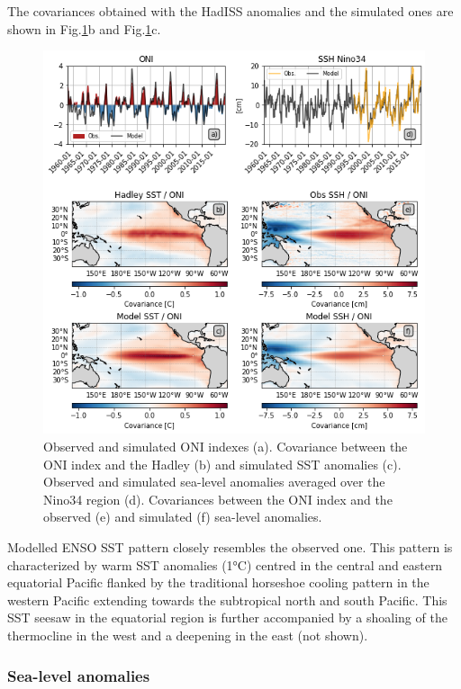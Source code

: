 The covariances obtained with the HadISS anomalies and the simulated ones are shown in Fig.\ref{fig:nemo-had-sst}b and Fig.\ref{fig:nemo-had-sst}c.

\begin{figure}
	\centering
	\includegraphics[scale=0.6]{figs/fig1.png}
	\caption{Observed and simulated ONI indexes (a). Covariance between the ONI index and the Hadley (b) and simulated SST anomalies (c). Observed and simulated sea-level anomalies averaged over the Nino34 region (d). Covariances between the ONI index and the observed (e) and simulated (f) sea-level anomalies.}
	\label{fig:nemo-had-sst}
\end{figure}

Modelled ENSO SST  pattern closely resembles the observed one. This pattern is characterized by warm SST anomalies (1°C) centred in the central and eastern equatorial Pacific  flanked by the traditional horseshoe cooling pattern in the western Pacific extending towards the subtropical north and south Pacific. This SST seesaw in the equatorial region is further accompanied by a shoaling of the thermocline in the west and a deepening in the east (not shown).

\subsubsection{Sea-level anomalies}

